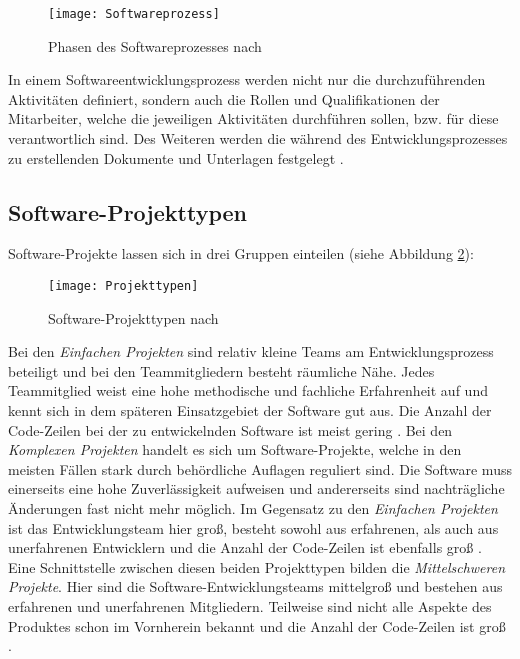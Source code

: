 \begin{figure}[htp]
\begin{center} 
  \texttt{[image: Softwareprozess]} %
  \caption{Phasen des Softwareprozesses nach \cite{Hanser2010}}
  \label{fig:SEProzess}
\end{center}
\end{figure}

In einem Softwareentwicklungsprozess werden nicht nur die durchzuführenden Aktivitäten definiert, sondern auch die Rollen und Qualifikationen der Mitarbeiter, welche die jeweiligen Aktivitäten durchführen sollen, bzw. für diese verantwortlich sind. Des Weiteren werden die während des Entwicklungsprozesses zu erstellenden Dokumente und Unterlagen festgelegt \cite{Hanser2010}.

\subsection{Software-Projekttypen}

Software-Projekte lassen sich in drei Gruppen einteilen (siehe Abbildung \ref{fig:Projektty}):
\begin{figure}[htp]
\begin{center}
  \texttt{[image: Projekttypen]} %
  \caption{Software-Projekttypen nach \cite{Boehm81}}
  \label{fig:Projektty}
\end{center}
\end{figure}
Bei den \textit{Einfachen Projekten} sind relativ kleine Teams am Entwicklungsprozess beteiligt und bei den Teammitgliedern besteht räumliche Nähe. Jedes Teammitglied weist eine hohe methodische und fachliche Erfahrenheit auf und kennt sich in dem späteren Einsatzgebiet der Software gut aus. Die Anzahl der Code-Zeilen bei der zu entwickelnden Software ist meist gering \cite{Boehm81, Hanser2010}. \newline
Bei den \textit{Komplexen Projekten} handelt es sich um Software-Projekte, welche in den meisten Fällen stark durch behördliche Auflagen reguliert sind. Die Software muss einerseits eine hohe Zuverlässigkeit aufweisen und andererseits sind nachträgliche Änderungen fast nicht mehr möglich. Im Gegensatz zu den \textit{Einfachen Projekten} ist das Entwicklungsteam hier groß, besteht sowohl aus erfahrenen, als auch aus unerfahrenen Entwicklern und die Anzahl der Code-Zeilen ist ebenfalls groß \cite{Boehm81, Hanser2010}. \newline
Eine Schnittstelle zwischen diesen beiden Projekttypen bilden die \textit{Mittelschweren Projekte}. Hier sind die Software-Entwicklungsteams mittelgroß und bestehen aus erfahrenen und unerfahrenen Mitgliedern. Teilweise sind nicht alle Aspekte des Produktes schon im Vornherein bekannt und die Anzahl der Code-Zeilen ist groß \cite{Boehm81, Hanser2010}.

